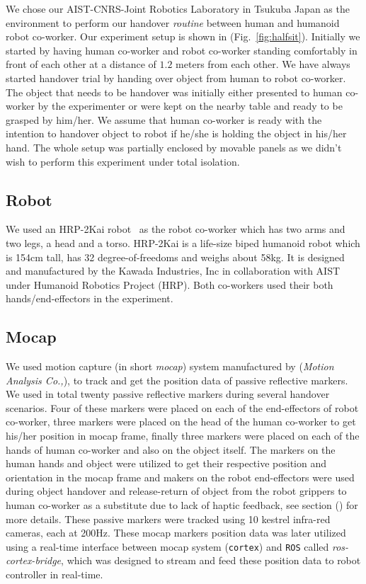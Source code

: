 We chose our AIST-CNRS-Joint Robotics Laboratory in Tsukuba Japan as the environment to perform our handover \textit{routine} between human and humanoid robot co-worker. Our experiment setup is shown in (Fig.~\ref{fig:halfsit}). Initially we started by having human co-worker and robot co-worker standing comfortably in front of each other at a distance of $ 1.2 $ meters from each other. We have always started handover trial by handing over object from human to robot co-worker. The object that needs to be handover was initially either presented to human co-worker by the experimenter or were kept on the nearby table and ready to be grasped by him/her. We assume that human co-worker is ready with the intention to handover object to robot if he/she is holding the object in his/her hand. The whole setup was partially enclosed by movable panels as we didn't wish to perform this experiment under total isolation.


\subsection{Robot}

We used an HRP-2Kai robot~\cite{Kaneko:RAS_ICHR:2015} as the robot co-worker which has two arms and two legs, a head and a torso. HRP-2Kai is a life-size biped humanoid robot which is 154cm tall, has 32 degree-of-freedoms and weighs about 58kg. It is designed and manufactured by the Kawada Industries, Inc in collaboration with AIST under Humanoid Robotics Project (HRP). Both co-workers used their both hands/end-effectors in the experiment.


\subsection{Mocap}

We used motion capture (in short \textit{mocap}) system manufactured by ({\it Motion Analysis Co.,}), to track and get the position data of passive reflective markers. We used in total twenty passive reflective markers during several handover scenarios. Four of these markers were placed on each of the end-effectors of robot co-worker, three markers were placed on the head of the human co-worker to get his/her position in mocap frame, finally three markers were placed on each of the hands of human co-worker and also on the object itself. The markers on the human hands and object were utilized to get their respective position and orientation in the mocap frame and makers on the robot end-effectors were used during object handover and release-return of object from  the robot grippers to human co-worker as a substitute due to lack of haptic feedback, see section () for more details. These passive markers were tracked using 10 kestrel infra-red cameras, each at 200Hz. These mocap markers position data was later utilized using a real-time interface between mocap system (\texttt{cortex}) and \texttt{ROS} called \textit{ros-cortex-bridge}, which was designed to stream and feed these position data to robot controller in real-time.

